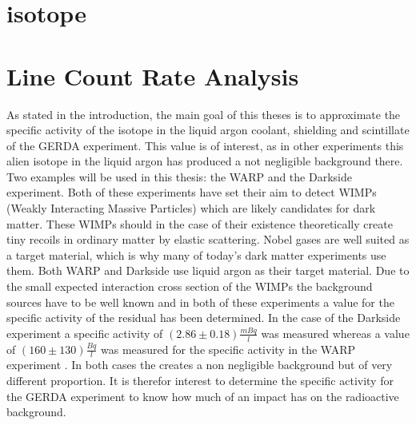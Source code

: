 


\chapter{\Kr isotope}
\label{sec:Kry85}


 
\chapter{Line Count Rate Analysis}
\label{sec:SAfrom514}


As stated in the introduction, the main goal of this theses is to approximate the specific activity of the isotope \Kr in the liquid argon coolant, shielding and scintillate of the GERDA experiment. 
This value is of interest, as in other experiments this alien isotope in the liquid argon has produced a not negligible background there. 
Two examples will be used in this thesis: the WARP and the Darkside experiment.
Both of these experiments have set their aim to detect WIMPs (Weakly Interacting Massive Particles) which are likely candidates for dark matter.
These WIMPs should in the case of their existence theoretically create tiny recoils in ordinary matter by elastic scattering.
Nobel gases are well suited as a target material, which is why many of today's dark matter experiments use them.
Both WARP and Darkside use liquid argon as their target material.
Due to the small expected interaction cross section of the WIMPs the background sources have to be well known and in both of these experiments a value for the specific activity of the residual \Kr has been determined.
In the case of the Darkside experiment a specific activity of  \((2.86\pm0.18) \frac{\unit{mBq}}{\unit{l}}\)  \cite{agnes_results_2016} was measured whereas a value of \((160\pm130)\frac{\unit{Bq}}{\unit{l}}\) was measured for the specific activity in the WARP experiment \cite{benetti_measurement_2006}.
In both cases the \Kr creates a non negligible background but of very different proportion. 
It is therefor interest to determine the specific activity for the GERDA experiment to know how much of an impact \Kr has on the radioactive background.
\\

